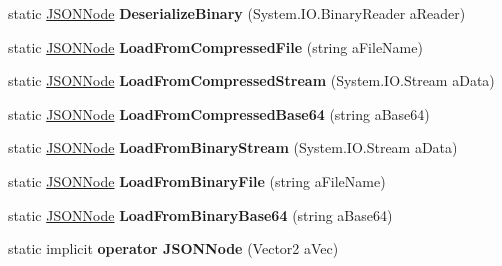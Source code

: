 \begin{DoxyCompactItemize}
\item 
static \hyperlink{classSimpleJSON_1_1JSONNode}{J\+S\+O\+N\+Node} {\bfseries Deserialize\+Binary} (System.\+I\+O.\+Binary\+Reader a\+Reader)\hypertarget{classSimpleJSON_1_1JSONNode_a7c9e725b2100acd69495ed8fa5599cb1}{}\label{classSimpleJSON_1_1JSONNode_a7c9e725b2100acd69495ed8fa5599cb1}

\item 
static \hyperlink{classSimpleJSON_1_1JSONNode}{J\+S\+O\+N\+Node} {\bfseries Load\+From\+Compressed\+File} (string a\+File\+Name)\hypertarget{classSimpleJSON_1_1JSONNode_abac001a8fcab3142c75bbff0067281e7}{}\label{classSimpleJSON_1_1JSONNode_abac001a8fcab3142c75bbff0067281e7}

\item 
static \hyperlink{classSimpleJSON_1_1JSONNode}{J\+S\+O\+N\+Node} {\bfseries Load\+From\+Compressed\+Stream} (System.\+I\+O.\+Stream a\+Data)\hypertarget{classSimpleJSON_1_1JSONNode_a446c6f9eda1a568172a20265c6f1c9c9}{}\label{classSimpleJSON_1_1JSONNode_a446c6f9eda1a568172a20265c6f1c9c9}

\item 
static \hyperlink{classSimpleJSON_1_1JSONNode}{J\+S\+O\+N\+Node} {\bfseries Load\+From\+Compressed\+Base64} (string a\+Base64)\hypertarget{classSimpleJSON_1_1JSONNode_a85b31d1f8da0eff4993671fb8538dcfb}{}\label{classSimpleJSON_1_1JSONNode_a85b31d1f8da0eff4993671fb8538dcfb}

\item 
static \hyperlink{classSimpleJSON_1_1JSONNode}{J\+S\+O\+N\+Node} {\bfseries Load\+From\+Binary\+Stream} (System.\+I\+O.\+Stream a\+Data)\hypertarget{classSimpleJSON_1_1JSONNode_a140f2c85a1aaf00384e2a973f4e988f3}{}\label{classSimpleJSON_1_1JSONNode_a140f2c85a1aaf00384e2a973f4e988f3}

\item 
static \hyperlink{classSimpleJSON_1_1JSONNode}{J\+S\+O\+N\+Node} {\bfseries Load\+From\+Binary\+File} (string a\+File\+Name)\hypertarget{classSimpleJSON_1_1JSONNode_a412c3bc9e3fffd06b2844241c88cbf8a}{}\label{classSimpleJSON_1_1JSONNode_a412c3bc9e3fffd06b2844241c88cbf8a}

\item 
static \hyperlink{classSimpleJSON_1_1JSONNode}{J\+S\+O\+N\+Node} {\bfseries Load\+From\+Binary\+Base64} (string a\+Base64)\hypertarget{classSimpleJSON_1_1JSONNode_acbecd916ba2ae5434a2e903a41a4de38}{}\label{classSimpleJSON_1_1JSONNode_acbecd916ba2ae5434a2e903a41a4de38}

\item 
static implicit {\bfseries operator J\+S\+O\+N\+Node} (Vector2 a\+Vec)\hypertarget{classSimpleJSON_1_1JSONNode_aa06789dde1433c018670449820162076}{}\label{classSimpleJSON_1_1JSONNode_aa06789dde1433c018670449820162076}


\end{DoxyCompactItemize}

